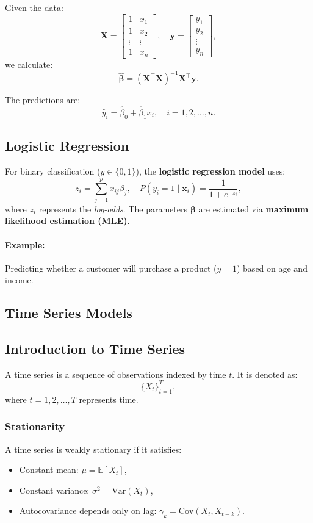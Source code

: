 \documentclass[12pt,a4paper]{article}
\begin{document}
Given the data:
\[
\mathbf{X} = 
\begin{bmatrix}
1 & x_1 \\
1 & x_2 \\
\vdots & \vdots \\
1 & x_n
\end{bmatrix}, \quad 
\mathbf{y} =
\begin{bmatrix}
y_1 \\
y_2 \\
\vdots \\
y_n
\end{bmatrix},
\]
we calculate:
\[
\hat{\boldsymbol{\beta}} = (\mathbf{X}^\top \mathbf{X})^{-1} \mathbf{X}^\top \mathbf{y}.
\]

The predictions are:
\[
\hat{y}_i = \hat{\beta}_0 + \hat{\beta}_1 x_i, \quad i = 1, 2, \dots, n.
\]


\subsection{Logistic Regression}
For binary classification (\( y \in \{0, 1\} \)), the \textbf{logistic regression model} uses:
\[
z_i = \sum_{j=1}^p x_{ij}\beta_j, \quad P(y_i = 1 \mid \mathbf{x}_i) = \frac{1}{1 + e^{-z_i}},
\]
where \( z_i \) represents the \textit{log-odds}. The parameters \( \boldsymbol{\beta} \) are estimated via \textbf{maximum likelihood estimation (MLE)}.

\paragraph{Example:}
Predicting whether a customer will purchase a product (\( y = 1 \)) based on age and income.

\subsection{Time Series Models}

\subsection{Introduction to Time Series}
A time series is a sequence of observations indexed by time \( t \). It is denoted as:
\[
\{X_t\}_{t=1}^{T},
\]
where \( t = 1, 2, \dots, T \) represents time.

\subsubsection{Stationarity}
A time series is weakly stationary if it satisfies:
\begin{itemize}
    \item Constant mean: \( \mu = \mathbb{E}[X_t] \),
    \item Constant variance: \( \sigma^2 = \text{Var}(X_t) \),
    \item Autocovariance depends only on lag: \( \gamma_k = \text{Cov}(X_t, X_{t-k}) \).
\end{itemize}
\end{document}
